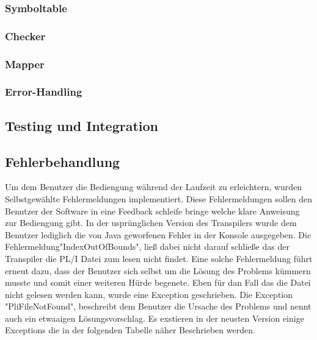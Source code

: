 \subsubsection{Symboltable}
\subsubsection{Checker}
\subsubsection{Mapper}
\subsubsection{Error-Handling}

\subsection{Testing und Integration}




\subsection{Fehlerbehandlung}
Um dem Benutzer die Bediengung während der Laufzeit zu erleichtern, wurden Selbstgewählte Fehlermeldungen implementiert. Diese Fehlermeldungen sollen den Benutzer der Software in eine Feedback schleife bringe welche klare Anweisung zur Bediengung gibt. In der usprünglichen Version des Transpilers wurde dem Benutzer lediglich die von Java geworfenen Fehler in der Konsole ausgegeben. Die Fehlermeldung"IndexOutOfBounds", ließ dabei nicht darauf schließe das der Transpiler die PL/I Datei zum lesen nicht findet. Eine solche Fehlermeldung führt erneut dazu, dass der Benutzer sich selbst um die Lösung des Problems kümmern musste und somit einer weiteren Hürde begenete.
Eben für dan Fall das die Datei nicht gelesen werden kann, wurde eine Exception geschrieben. Die Exception "PliFileNotFound", beschreibt dem Benutzer die Ursache des Problems und nennt auch ein etwaaigen Lösungsvorschlag. Es exstieren in der neusten Version einige Exceptions die in der folgenden Tabelle näher Beschrieben werden.

